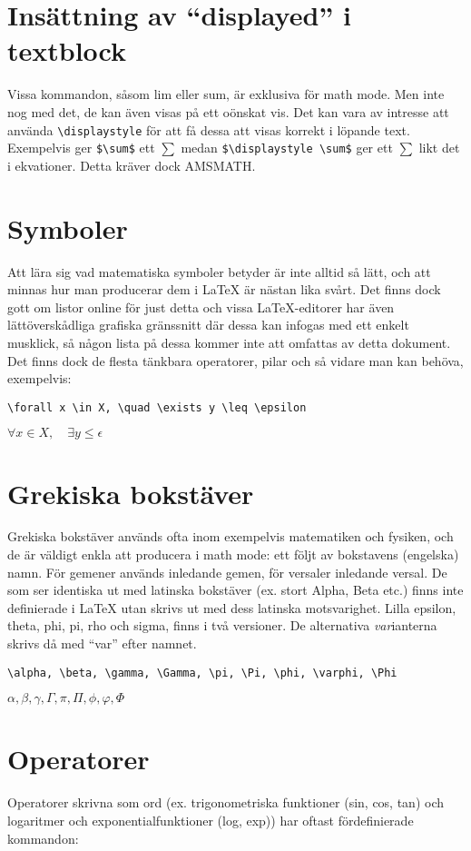 \section{Insättning av ``displayed'' i textblock}
Vissa kommandon, såsom \tb lim eller \tb sum, är exklusiva för math mode. Men inte nog med det, de kan även visas på ett oönskat vis. Det kan vara av intresse att använda \verb+\displaystyle+ för att få dessa att visas korrekt i löpande text. Exempelvis ger \verb+$\sum$+ ett $\sum$ medan \verb+$\displaystyle \sum$+ ger ett $\displaystyle \sum$ likt det i ekvationer. Detta kräver dock AMSMATH.

\section{Symboler}
Att lära sig vad matematiska symboler betyder är inte alltid så lätt, och att minnas hur man producerar dem i \LaTeX{} är nästan lika svårt. Det finns dock gott om listor online för just detta och vissa \LaTeX-editorer har även lättöverskådliga grafiska gränssnitt där dessa kan infogas med ett enkelt musklick, så någon lista på dessa kommer inte att omfattas av detta dokument. Det finns dock de flesta tänkbara operatorer, pilar och så vidare man kan behöva, exempelvis:

\verb+\forall x \in X, \quad \exists y \leq \epsilon+

$\forall x \in X, \quad \exists y \leq \epsilon$

\section{Grekiska bokstäver}
Grekiska bokstäver används ofta inom exempelvis matematiken och fysiken, och de är väldigt enkla att producera i math mode: ett \tb följt av bokstavens (engelska) namn. För gemener används inledande gemen, för versaler inledande versal. De som ser identiska ut med latinska bokstäver (ex. stort Alpha, Beta etc.) finns inte definierade i \LaTeX{} utan skrivs ut med dess latinska motsvarighet. Lilla epsilon, theta, phi, pi, rho och sigma, finns i två versioner. De alternativa \emph{var}ianterna skrivs då med ``var'' efter namnet.

\verb+\alpha, \beta, \gamma, \Gamma, \pi, \Pi, \phi, \varphi, \Phi+

$\alpha, \beta, \gamma, \Gamma, \pi, \Pi, \phi, \varphi, \Phi$

\section{Operatorer}
Operatorer skrivna som ord (ex. trigonometriska funktioner (sin, cos, tan) och logaritmer och exponentialfunktioner (log, exp)) har oftast fördefinierade kommandon:

